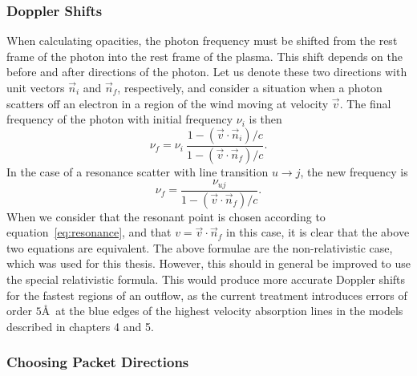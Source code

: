 \subsubsection{Doppler Shifts}
When calculating opacities, the photon frequency must be shifted from
the rest frame of the photon into the rest frame of the plasma.
This shift depends on the before and after directions of the photon. Let us denote
these two directions with unit vectors $\vec{n}_i$ and $\vec{n}_f$, respectively,
and consider a situation when a photon scatters off an electron in a region of the
wind moving at velocity $\vec{v}$.
The final frequency of the photon with initial frequency $\nu_i$ is then 
\begin{equation}
\nu_f = \nu_i ~\frac{1 - (\vec{v} \cdot \vec{n}_i) / c}{1 - (\vec{v} \cdot \vec{n}_f) / c}.
\end{equation}
In the case of a resonance scatter with line transition $u \rightarrow j$, the 
new frequency is
\begin{equation}
\nu_f = \frac{\nu_{uj}}{1 - (\vec{v} \cdot \vec{n}_f) / c}.
\end{equation}
When we consider that the resonant point is chosen according to 
equation~\ref{eq:resonance}, and that $v=\vec{v} \cdot \vec{n}_f$ in this case,
it is clear that the above two equations are equivalent. The above formulae are the 
non-relativistic case, which was used for this thesis. However, this should in general 
be improved to use the special relativistic formula.
This would produce more accurate Doppler shifts for the fastest regions of an
outflow, as the current treatment 
introduces errors of order $5$\AA\ at the blue edges of the highest velocity
absorption lines in the models described in chapters 4 and 5.



\subsubsection{Choosing Packet Directions}

